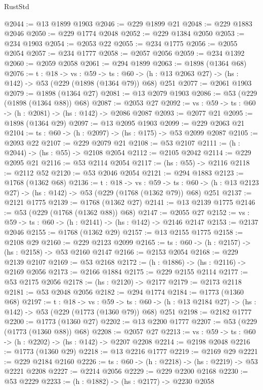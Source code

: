 \begin{lexlean}{RustStd}
\begin{coremodule}
@2044 := @13 @1899 @1903
@2046 := @229 @1899 @21
@2048 := @229 @1883 @2046
@2050 := @229 @1774 @2048
@2052 := @229 @1384 @2050
@2053 := @234 @1903
@2054 := @2053 @22
@2055 := @234 @1775
@2056 := @2055 @2054
@2057 := @234 @1777
@2058 := @2057 @2056
@2059 := @234 @1392
@2060 := @2059 @2058
@2061 := @294 @1899
@2063 := @1898 (@1364 @68)
@2076 := {t : @18} ->
  {vs : @59} ->
  {ts : @60} -> (h : @13 @2063 @27) -> (hs : @142) -> @53 (@229 (@1898 (@1364 @79)) @68) @251
@2077 := @2061 @1903
@2079 := @1898 (@1364 @27)
@2081 := @13 @2079 @1903
@2086 := @53 (@229 (@1898 (@1364 @88)) @68)
@2087 := @2053 @27
@2092 := {vs : @59} -> {ts : @60} -> (h : @2081) -> (hs : @142) -> @2086 @2087
@2093 := @2077 @21
@2095 := @1898 (@1364 @29)
@2097 := @13 @2095 @1903
@2099 := @229 @2063 @21
@2104 := {ts : @60} -> (h : @2097) -> (hs : @175) -> @53 @2099 @2087
@2105 := @2093 @22
@2107 := @229 @2079 @21
@2108 := @53 @2107
@2111 := (h : @2044) -> (hs : @55) -> @2108 @2054
@2112 := @2105 @2042
@2114 := @229 @2095 @21
@2116 := @53 @2114 @2054
@2117 := (hs : @55) -> @2116
@2118 := @2112 @52
@2120 := @53 @2046 @2054
@2121 := @294 @1883
@2123 := @1768 (@1362 @68)
@2136 := {t : @18} ->
  {vs : @59} ->
  {ts : @60} -> (h : @13 @2123 @27) -> (hs : @142) -> @53 (@229 (@1768 (@1362 @79)) @68) @251
@2137 := @2121 @1775
@2139 := @1768 (@1362 @27)
@2141 := @13 @2139 @1775
@2146 := @53 (@229 (@1768 (@1362 @88)) @68)
@2147 := @2055 @27
@2152 := {vs : @59} -> {ts : @60} -> (h : @2141) -> (hs : @142) -> @2146 @2147
@2153 := @2137 @2046
@2155 := @1768 (@1362 @29)
@2157 := @13 @2155 @1775
@2158 := @2108 @29
@2160 := @229 @2123 @2099
@2165 := {ts : @60} -> (h : @2157) -> (hs : @2158) -> @53 @2160 @2147
@2166 := @2153 @2054
@2168 := @229 @2139 @2107
@2169 := @53 @2168
@2172 := (h : @1886) -> (hs : @2116) -> @2169 @2056
@2173 := @2166 @1884
@2175 := @229 @2155 @2114
@2177 := @53 @2175 @2056
@2178 := (hs : @2120) -> @2177
@2179 := @2173 @2118
@2181 := @53 @2048 @2056
@2182 := @294 @1774
@2184 := @1773 (@1360 @68)
@2197 := {t : @18} ->
  {vs : @59} ->
  {ts : @60} -> (h : @13 @2184 @27) -> (hs : @142) -> @53 (@229 (@1773 (@1360 @79)) @68) @251
@2198 := @2182 @1777
@2200 := @1773 (@1360 @27)
@2202 := @13 @2200 @1777
@2207 := @53 (@229 (@1773 (@1360 @88)) @68)
@2208 := @2057 @27
@2213 := {vs : @59} -> {ts : @60} -> (h : @2202) -> (hs : @142) -> @2207 @2208
@2214 := @2198 @2048
@2216 := @1773 (@1360 @29)
@2218 := @13 @2216 @1777
@2219 := @2169 @29
@2221 := @229 @2184 @2160
@2226 := {ts : @60} -> (h : @2218) -> (hs : @2219) -> @53 @2221 @2208
@2227 := @2214 @2056
@2229 := @229 @2200 @2168
@2230 := @53 @2229
@2233 := (h : @1882) -> (hs : @2177) -> @2230 @2058

\end{coremodule}
\end{lexlean}

